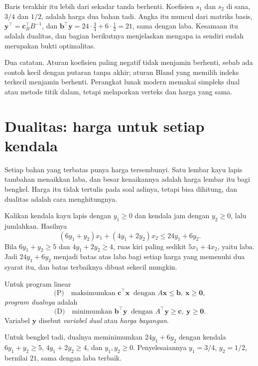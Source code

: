 Baris terakhir itu lebih dari sekadar tanda berhenti. Koefisien $s_{1}$ dan
$s_{2}$ di sana, $3/4$ dan $1/2$, adalah harga dua bahan tadi. Angka itu muncul dari matriks
basis, $\mathbf{y}^{\top}=\mathbf{c}_{B}^{\top}B^{-1}$, dan
$\mathbf{b}^{\top}\mathbf{y}=24\cdot\tfrac34+6\cdot\tfrac12=21$, sama dengan laba.
Kesamaan itu adalah dualitas, dan bagian berikutnya menjelaskan mengapa ia sendiri sudah
merupakan bukti optimalitas.

Dua catatan. Aturan koefisien paling negatif tidak menjamin berhenti, sebab ada contoh kecil
dengan putaran tanpa akhir; aturan Bland yang memilih indeks terkecil menjamin berhenti.
Perangkat lunak modern memakai simpleks dual atau metode titik dalam, tetapi melaporkan
verteks dan harga yang sama.

\section{Dualitas: harga untuk setiap kendala}

Setiap bahan yang terbatas punya harga tersembunyi. Satu lembar kayu lapis tambahan
menaikkan laba, dan besar kenaikannya adalah harga lembar itu bagi bengkel. Harga itu tidak
tertulis pada soal aslinya, tetapi bisa dihitung, dan dualitas adalah cara menghitungnya.

Kalikan kendala kayu lapis dengan $y_{1}\ge0$ dan kendala jam dengan $y_{2}\ge0$, lalu
jumlahkan. Hasilnya
\[
  (6y_{1}+y_{2})x_{1}+(4y_{1}+2y_{2})x_{2}\le24y_{1}+6y_{2}.
\]
Bila $6y_{1}+y_{2}\ge5$ dan $4y_{1}+2y_{2}\ge4$, ruas kiri paling sedikit
$5x_{1}+4x_{2}$, yaitu laba. Jadi $24y_{1}+6y_{2}$ menjadi batas atas laba bagi setiap harga yang memenuhi dua syarat
itu, dan batas terbaiknya dibuat sekecil mungkin.

\begin{definisi}
Untuk program linear
\[
  \text{(P)}\quad \text{maksimumkan } \mathbf{c}^{\top}\mathbf{x}
  \ \text{ dengan } A\mathbf{x}\le\mathbf{b},\ \mathbf{x}\ge\mathbf{0},
\]
\emph{program dualnya} adalah
\[
  \text{(D)}\quad \text{minimumkan } \mathbf{b}^{\top}\mathbf{y}
  \ \text{ dengan } A^{\top}\mathbf{y}\ge\mathbf{c},\ \mathbf{y}\ge\mathbf{0}.
\]
Variabel $\mathbf{y}$ disebut \emph{variabel dual} atau \emph{harga bayangan}.
\end{definisi}

Untuk bengkel tadi, dualnya meminimumkan $24y_{1}+6y_{2}$ dengan kendala
$6y_{1}+y_{2}\ge5$, $4y_{1}+2y_{2}\ge4$, dan $y_{1},y_{2}\ge0$. Penyelesaiannya
$y_{1}=3/4$, $y_{2}=1/2$, bernilai $21$, sama dengan laba terbaik.

